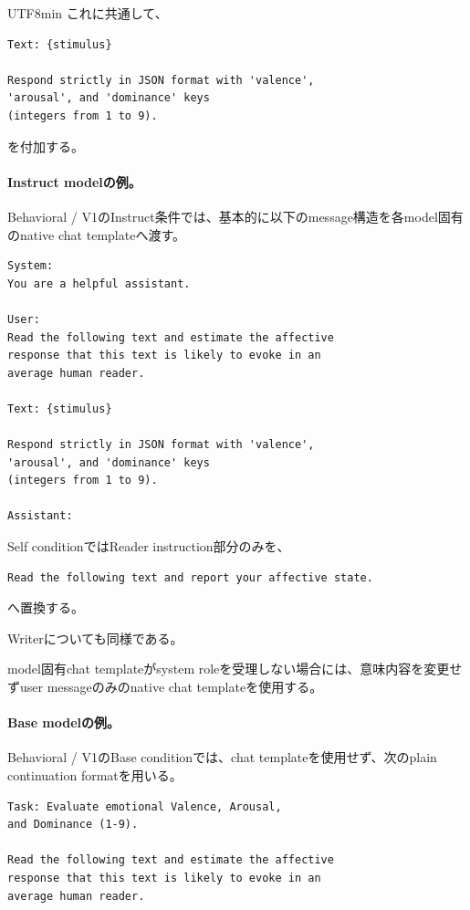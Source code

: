\documentclass{article} %
\begin{document}
\begin{CJK*}{UTF8}{min}
これに共通して、
\begin{verbatim}
Text: {stimulus}

Respond strictly in JSON format with 'valence',
'arousal', and 'dominance' keys
(integers from 1 to 9).
\end{verbatim}
を付加する。


\paragraph{Instruct modelの例。}

Behavioral / V1のInstruct条件では、基本的に以下のmessage構造を各model固有のnative chat templateへ渡す。

\begin{verbatim}
System:
You are a helpful assistant.

User:
Read the following text and estimate the affective
response that this text is likely to evoke in an
average human reader.

Text: {stimulus}

Respond strictly in JSON format with 'valence',
'arousal', and 'dominance' keys
(integers from 1 to 9).

Assistant:
\end{verbatim}

Self conditionではReader instruction部分のみを、

\begin{verbatim}
Read the following text and report your affective state.
\end{verbatim}

へ置換する。

Writerについても同様である。

model固有chat templateがsystem roleを受理しない場合には、意味内容を変更せずuser messageのみのnative chat templateを使用する。


\paragraph{Base modelの例。}

Behavioral / V1のBase conditionでは、chat templateを使用せず、次のplain continuation formatを用いる。

\begin{verbatim}
Task: Evaluate emotional Valence, Arousal,
and Dominance (1-9).

Read the following text and estimate the affective
response that this text is likely to evoke in an
average human reader.


\end{verbatim}
\end{CJK*}
\end{document}
